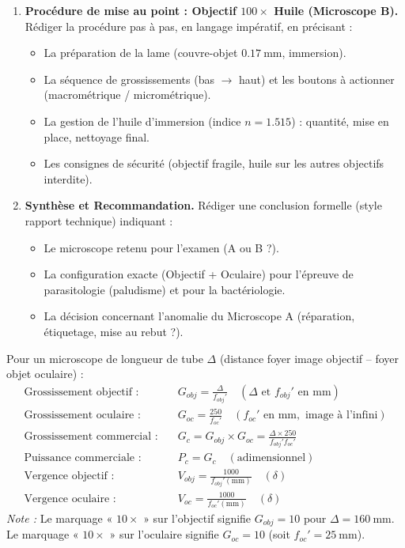 \documentclass[11pt]{article}
\newcounter{popsec}
\newcounter{popsub}
\newcommand{\courssub}[1]{%
  \stepcounter{popsub}%
  \par\vspace{9pt}\noindent{\popxbold\fontsize{11.5}{13}\selectfont\color{popink}{\color{poporange}\thepopsec.\thepopsub}\hspace{6pt}#1}\par\nopagebreak\vspace{4pt}
}
\begin{document}
\begin{enumerate}
    \item \textbf{Procédure de mise au point : Objectif $100\times$ Huile (Microscope B).} Rédiger la procédure pas à pas, en langage impératif, en précisant :
    \begin{itemize}
        \item La préparation de la lame (couvre-objet $\SI{0,17}{\mm}$, immersion).
        \item La séquence de grossissements (bas $\to$ haut) et les boutons à actionner (macrométrique / micrométrique).
        \item La gestion de l'huile d'immersion (indice $n = \num{1,515}$) : quantité, mise en place, nettoyage final.
        \item Les consignes de sécurité (objectif fragile, huile sur les autres objectifs interdite).
    \end{itemize}

    \item \textbf{Synthèse et Recommandation.} Rédiger une conclusion formelle (style rapport technique) indiquant : 
    \begin{itemize}
        \item Le microscope retenu pour l'examen (A ou B ?).
        \item La configuration exacte (Objectif + Oculaire) pour l'épreuve de parasitologie (paludisme) et pour la bactériologie.
        \item La décision concernant l'anomalie du Microscope A (réparation, étiquetage, mise au rebut ?).
    \end{itemize}
\end{enumerate}

\courssub{Ressources à mobiliser}
\begin{propriete}
Pour un microscope de longueur de tube $\Delta$ (distance foyer image objectif -- foyer objet oculaire) :
\begin{align*}
    \text{Grossissement objectif :}\quad & G_{obj} = \frac{\Delta}{f_{obj}'} \quad (\Delta \text{ et } f_{obj}' \text{ en mm}) \\
    \text{Grossissement oculaire :}\quad & G_{oc} = \frac{250}{f_{oc}'} \quad (f_{oc}' \text{ en mm}, \text{ image à l'infini}) \\
    \text{Grossissement commercial :}\quad & G_c = G_{obj} \times G_{oc} = \frac{\Delta \times 250}{f_{obj}' f_{oc}'} \\
    \text{Puissance commerciale :}\quad & P_c = G_c \quad (\text{adimensionnel}) \\
    \text{Vergence objectif :}\quad & V_{obj} = \frac{1000}{f_{obj}'(\text{mm})} \quad (\delta) \\
    \text{Vergence oculaire :}\quad & V_{oc} = \frac{1000}{f_{oc}'(\text{mm})} \quad (\delta)
\end{align*}
\emph{Note :} Le marquage « $10\times$ » sur l'objectif signifie $G_{obj} = 10$ pour $\Delta = \SI{160}{\mm}$. Le marquage « $10\times$ » sur l'oculaire signifie $G_{oc} = 10$ (soit $f_{oc}' = \SI{25}{\mm}$).
\end{propriete}
\end{document}
